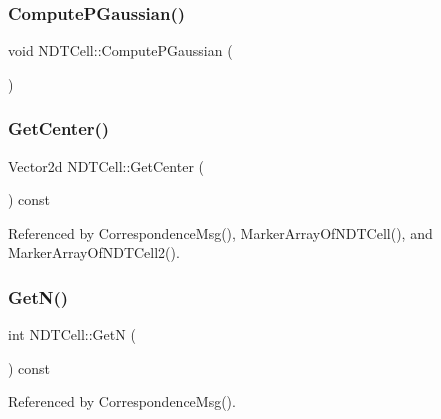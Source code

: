 \mbox{\label{classNDTCell_a7e8ff09fd2f739e3185721fd3c6bc910}} 
\subsubsection{\texorpdfstring{Compute\+P\+Gaussian()}{ComputePGaussian()}}
{\footnotesize\ttfamily void N\+D\+T\+Cell\+::\+Compute\+P\+Gaussian (\begin{DoxyParamCaption}{ }\end{DoxyParamCaption})}

\mbox{\label{classNDTCell_a322b936861945a4da2e712295529eda3}} 
\subsubsection{\texorpdfstring{Get\+Center()}{GetCenter()}}
{\footnotesize\ttfamily Vector2d N\+D\+T\+Cell\+::\+Get\+Center (\begin{DoxyParamCaption}{ }\end{DoxyParamCaption}) const\hspace{0.3cm}{\ttfamily [inline]}}



Referenced by Correspondence\+Msg(), Marker\+Array\+Of\+N\+D\+T\+Cell(), and Marker\+Array\+Of\+N\+D\+T\+Cell2().

\mbox{\label{classNDTCell_a0bb405d7e5bc95bd21848ae3d6283f71}} 
\subsubsection{\texorpdfstring{Get\+N()}{GetN()}}
{\footnotesize\ttfamily int N\+D\+T\+Cell\+::\+GetN (\begin{DoxyParamCaption}{ }\end{DoxyParamCaption}) const\hspace{0.3cm}{\ttfamily [inline]}}



Referenced by Correspondence\+Msg().

